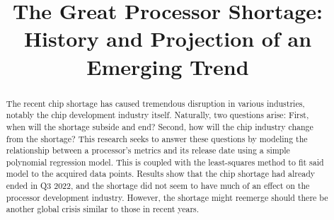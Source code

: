 \documentclass[conference]{IEEEtran}
\begin{document}
\title{
	The Great Processor Shortage:\\
	History and Projection of an Emerging Trend
}

\author{
	\and
	\and
	\and
}

\maketitle

\begin{abstract}
	The recent chip shortage has caused tremendous disruption in various
	industries, notably the chip development industry itself. Naturally,
	two questions arise: First, when will the shortage subside and end? Second,
	how will the chip industry change from the shortage? This research
	seeks to answer these questions by modeling the relationship between a
	processor's metrics and its release date using a simple polynomial
	regression model. This is coupled with the least-squares method to fit
	said model to the acquired data points. Results show that the chip
	shortage had already ended in Q3 2022, and the shortage did not seem to
	have much of an effect on the processor development industry. However,
	the shortage might reemerge should there be another global crisis similar
	to those in recent years.
\end{abstract}
\end{document}
